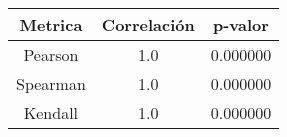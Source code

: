 
\begin{tabular}{|c|c|c|}
\hline
Metrica & Correlación & p-valor \\ 
\hline
Pearson    & 1.0   & 0.000000   \\ 
Spearman   & 1.0   & 0.000000   \\ 
Kendall    & 1.0   & 0.000000   \\ 
\hline
\end{tabular}

